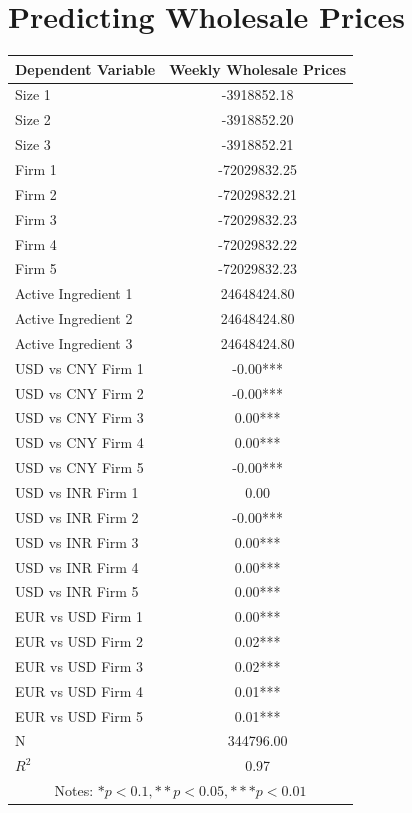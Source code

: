 \documentclass[12pt, authoryear]{elsarticle}
\begin{document}
\section{Predicting Wholesale Prices} \label{wholesale_prices}
\begin{table}[H]
	\begin{tabular}{lc} \hline \hline
		\cellcolor{gray!25}  Dependent Variable & \cellcolor{gray!25}  Weekly Wholesale Prices \\ \hline
		Size 1 & -3918852.18 \\
		Size 2 & -3918852.20 \\
		Size 3 & -3918852.21 \\
		Firm 1 & -72029832.25 \\
		Firm 2 & -72029832.21 \\
		Firm 3 & -72029832.23 \\
		Firm 4 & -72029832.22 \\
		Firm 5 & -72029832.23 \\
		Active Ingredient 1 & 24648424.80 \\
		Active Ingredient 2 & 24648424.80 \\
		Active Ingredient 3 & 24648424.80 \\
		USD vs CNY Firm 1 & -0.00*** \\
		USD vs CNY Firm 2 & -0.00*** \\
		USD vs CNY Firm 3 & 0.00*** \\
		USD vs CNY Firm 4 & 0.00*** \\
		USD vs CNY Firm 5 & -0.00*** \\
		USD vs INR Firm 1 & 0.00 \\
		USD vs INR Firm 2 & -0.00*** \\
		USD vs INR Firm 3 & 0.00*** \\
		USD vs INR Firm 4 & 0.00*** \\
		USD vs INR Firm 5 & 0.00*** \\
		EUR vs USD Firm 1 & 0.00*** \\
		EUR vs USD Firm 2 & 0.02*** \\
		EUR vs USD Firm 3 & 0.02*** \\
		EUR vs USD Firm 4 & 0.01*** \\
		EUR vs USD Firm 5 & 0.01*** \\ \hline
		N & 344796.00 \\
		$R^{2}$ & 0.97 \\  \hline \hline
		\multicolumn{2}{c}{Notes: $* p<0.1, ** p<0.05, ***p<0.01$}    
	\end{tabular}
\end{table}
\end{document}
